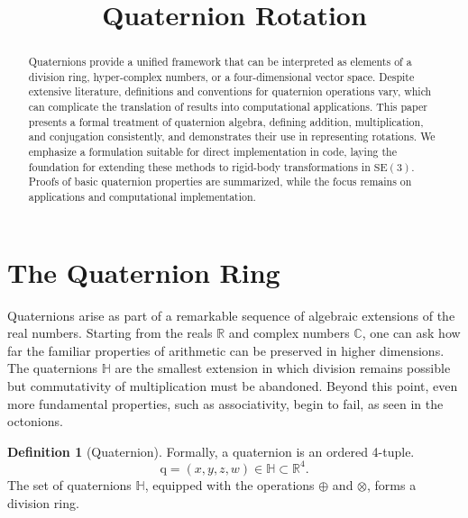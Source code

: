 \documentclass{amsart}
\theoremstyle{definition}
\newtheorem{definition}[theorem]{Definition}
\theoremstyle{remark}
\numberwithin{equation}{section}
\begin{document}
\title{Quaternion Rotation}

\begin{abstract}
  Quaternions provide a unified framework that can be interpreted as elements of a division ring, hyper-complex numbers, or a four-dimensional vector space.
  Despite extensive literature, definitions and conventions for quaternion operations vary, which can complicate the translation of results into computational applications.
  This paper presents a formal treatment of quaternion algebra, defining addition, multiplication, and conjugation consistently, and demonstrates their use in representing rotations.
  We emphasize a formulation suitable for direct implementation in code, laying the foundation for extending these methods to rigid-body transformations in $\mathrm{SE}(3)$.
  Proofs of basic quaternion properties are summarized, while the focus remains on applications and computational implementation.
\end{abstract}

\maketitle

\section{The Quaternion Ring}
Quaternions arise as part of a remarkable sequence of algebraic extensions of the real numbers.
Starting from the reals $\mathbb{R}$ and complex numbers $\mathbb{C}$, one can ask how far the familiar properties of arithmetic can be preserved in higher dimensions.
The quaternions $\mathbb{H}$ are the smallest extension in which division remains possible but commutativity of multiplication must be abandoned.
Beyond this point, even more fundamental properties, such as associativity, begin to fail, as seen in the octonions.
\begin{definition}[Quaternion]
  Formally, a quaternion is an ordered 4-tuple.
  \begin{equation}
    \mathrm{q} = (x, y, z, w) \in \mathbb{H} \subset \mathbb{R}^4.
  \end{equation}
  The set of quaternions $\mathbb{H}$, equipped with the operations $\oplus$ and $\otimes$, forms a division ring.
\end{definition}
\end{document}
